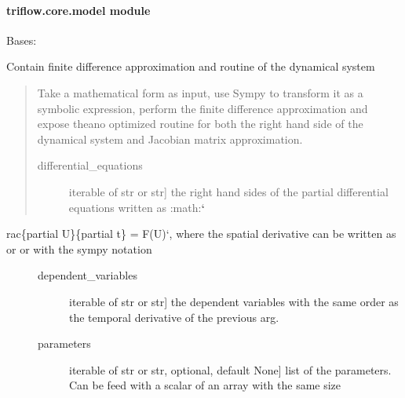 \documentclass[letterpaper,10pt,english]{sphinxmanual}
\begin{document}
\paragraph{triflow.core.model module}
\label{\detokenize{triflow.core:module-triflow.core.model}}\label{\detokenize{triflow.core:triflow-core-model-module}}

\begin{fulllineitems}
\label{\detokenize{triflow.core:triflow.core.model.Model}}
Bases: 

Contain finite difference approximation and routine of the dynamical system
\begin{quote}

Take a mathematical form as input, use Sympy to transform it as a symbolic
expression, perform the finite difference approximation and expose theano
optimized routine for both the right hand side of the dynamical system and
Jacobian matrix approximation.
\begin{description}
\item[{differential\_equations}] \leavevmode{[}iterable of str or str{]}
the right hand sides of the partial differential equations written as :math:{\color{red}\bfseries{}{}`}

\end{description}
\end{quote}
\begin{description}
\item[{rac\{partial U\}\{partial t\} = F(U){}`, where the spatial derivative can be written as  or  or with the sympy notation }] \leavevmode\begin{description}
\item[{dependent\_variables}] \leavevmode{[}iterable of str or str{]}
the dependent variables with the same order as the temporal derivative of the previous arg.

\item[{parameters}] \leavevmode{[}iterable of str or str, optional, default None{]}
list of the parameters. Can be feed with a scalar of an array with the same size


\end{description}
\end{description}
\end{fulllineitems}
\end{document}
